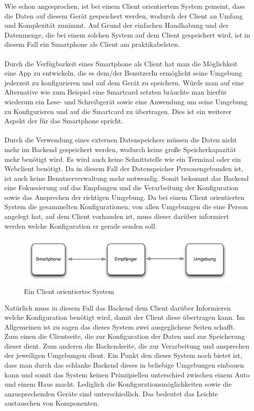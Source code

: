 Wie schon angesprochen, ist bei einem Client orientiertem System gemeint, dass die Daten auf diesem Gerät gespeichert werden, wodurch der Client an Umfang und Komplexität zunimmt. Auf Grund der einfachen Handhabung und der Datenmenge, die bei einem solchen System auf dem Client gespeichert wird, ist in diesem Fall ein Smartphone als Client am praktikabelsten.  
\\\\
Durch die Verfügbarkeit eines Smartphone als Client hat man die Möglichkeit eine App zu entwickeln, die es dem/der BenutzerIn ermöglicht seine Umgebung jederzeit zu konfigurieren und auf dem Gerät zu speichern. Würde man auf eine Alternative wie zum Beispiel eine Smartcard setzten bräuchte man hierfür wiederum ein Lese- und Schreibgerät sowie eine Anwendung um seine Umgebung zu Konfigurieren und auf die Smartcard zu übertragen. Dies ist ein weiterer Aspekt der für das Smartphone spricht.
\\\\
Durch die Verwendung eines externen Datenspeichers müssen die Daten nicht mehr im Backend gespeichert werden, wodurch keine große Speicherkapazität mehr benötigt wird. Es wird auch keine Schnittstelle wie ein Terminal oder ein Webclient benötigt. Da in diesem Fall der Datenspeicher Personengebunden ist, ist auch keine Benutzerverwaltung mehr notwendig. Somit bekommt das Backend eine Fokussierung auf das Empfangen und die Verarbeitung der Konfiguration sowie das Ansprechen der richtigen Umgebung.
Da bei einem Client orientierten System die gesammelten Konfigurationen, von allen Umgebungen die eine Person angelegt hat, auf dem Client vorhanden ist, muss dieser darüber informiert werden welche Konfiguration er gerade senden soll. 
\begin{figure}[H]
\includegraphics[width=12.5cm]{images/client}
\caption{Ein Client orientiertes System}
\end{figure}
Natürlich muss in diesem Fall das Backend dem Client darüber Informieren welche Konfiguration benötigt wird, damit der Client diese übertragen kann. Im Allgemeinen ist zu sagen das dieses System zwei ausgeglichene Seiten schafft. Zum einen die Clientseite, die zur Konfiguration der Daten und zur Speicherung dieser dient. Zum anderen die Backendseite, die zur Verarbeitung und ansprechen der jeweiligen Umgebungen dient. Ein Punkt den dieses System noch bietet ist, dass man durch das schlanke Backend dieses in beliebige Umgebungen einbauen kann und somit das System keinen Prinzipiellen unterschied zwischen einem Auto und einem Haus macht. Lediglich die Konfigurationsmöglichkeiten sowie die anzusprechenden Geräte sind unterschiedlich. Das bedeutet das Leichte austauschen von Komponenten.

